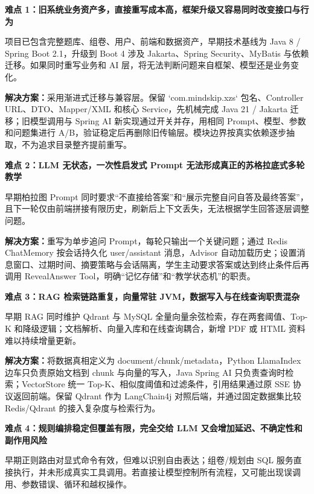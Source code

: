 
\textbf{难点 1：旧系统业务资产多，直接重写成本高，框架升级又容易同时改变接口与行为}

项目已包含完整题库、组卷、用户、前端和数据资产，早期技术基线为 Java 8 / Spring Boot 2.1，升级到 Boot 4 涉及 Jakarta、Spring Security、MyBatis 与依赖迁移。如果同时重写业务和 AI 层，将无法判断问题来自框架、模型还是业务变化。

\textbf{解决方案：}采用渐进式迁移与兼容层。保留 `com.mindskip.xzs` 包名、Controller URL、DTO、Mapper/XML 和核心 Service，先机械完成 Java 21 / Jakarta 迁移；旧模型调用与 Spring AI 新实现通过开关并存，用相同 Prompt、模型、参数和问题集进行 A/B，验证稳定后再删除旧传输层。模块边界按真实依赖逐步抽取，不为追求目录整齐提前重写。

\vspace{0.5ex}
\textbf{难点 2：LLM 无状态，一次性启发式 Prompt 无法形成真正的苏格拉底式多轮教学}

早期柏拉图 Prompt 同时要求“不直接给答案”和“展示完整自问自答及最终答案”，且下一轮仅由前端拼接有限历史，刷新后上下文丢失，无法根据学生回答逐层调整问题。

\textbf{解决方案：}重写为单步追问 Prompt，每轮只输出一个关键问题；通过 Redis ChatMemory 按会话持久化 user/assistant 消息，Advisor 自动加载历史；设置消息窗口、过期时间、摘要策略与会话隔离，学生主动要求答案或达到终止条件后再调用 RevealAnswer Tool，明确“记忆存储”和“教学状态机”的职责。

\vspace{0.5ex}
\textbf{难点 3：RAG 检索链路重复，向量常驻 JVM，数据写入与在线查询职责混杂}

早期 RAG 同时维护 Qdrant 与 MySQL 全量向量余弦检索，存在两套阈值、Top-K 和降级逻辑；文档解析、向量入库和在线查询耦合，新增 PDF 或 HTML 资料难以持续增量更新。

\textbf{解决方案：}将数据真相定义为 document/chunk/metadata，Python LlamaIndex 边车只负责原始文档到 chunk 与向量的写入，Java Spring AI 只负责查询时检索；VectorStore 统一 Top-K、相似度阈值和过滤条件，引用结果通过原 SSE 协议返回前端。保留 Qdrant 作为 LangChain4j 对照后端，并通过固定数据集比较 Redis/Qdrant 的接入复杂度与检索行为。

\vspace{0.5ex}
\textbf{难点 4：规则编排稳定但覆盖有限，完全交给 LLM 又会增加延迟、不确定性和副作用风险}

早期正则路由对显式命令有效，但难以识别自由表达；组卷/规划由 SQL 服务直接执行，并未形成真实工具调用。若直接让模型控制所有流程，又可能出现误调用、参数错误、循环和越权操作。

